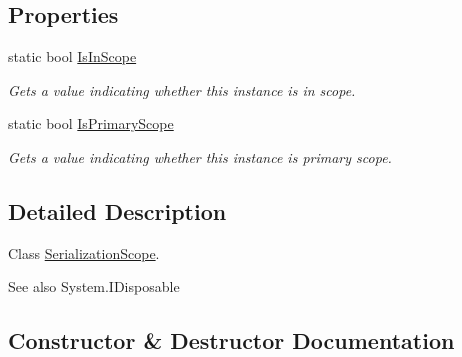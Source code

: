 \subsection*{Properties}
\begin{DoxyCompactItemize}
\item 
static bool \hyperlink{class_serialization_1_1_unity_serializer_1_1_serialization_scope_acd527aba526e1163ea14ff5a948ea01d}{Is\+In\+Scope}
\begin{DoxyCompactList}\small\item\em Gets a value indicating whether this instance is in scope. \end{DoxyCompactList}\item 
static bool \hyperlink{class_serialization_1_1_unity_serializer_1_1_serialization_scope_a31c0f0a357ffc96fe09e9df649ae0168}{Is\+Primary\+Scope}
\begin{DoxyCompactList}\small\item\em Gets a value indicating whether this instance is primary scope. \end{DoxyCompactList}\end{DoxyCompactItemize}


\subsection{Detailed Description}
Class \hyperlink{class_serialization_1_1_unity_serializer_1_1_serialization_scope}{Serialization\+Scope}. 

\begin{DoxySeeAlso}{See also}
System.\+I\+Disposable


\end{DoxySeeAlso}


\subsection{Constructor \& Destructor Documentation}
\mbox{\label{class_serialization_1_1_unity_serializer_1_1_serialization_scope_a78abf81cfefbd73c5f45707fa4cc7635}} 
